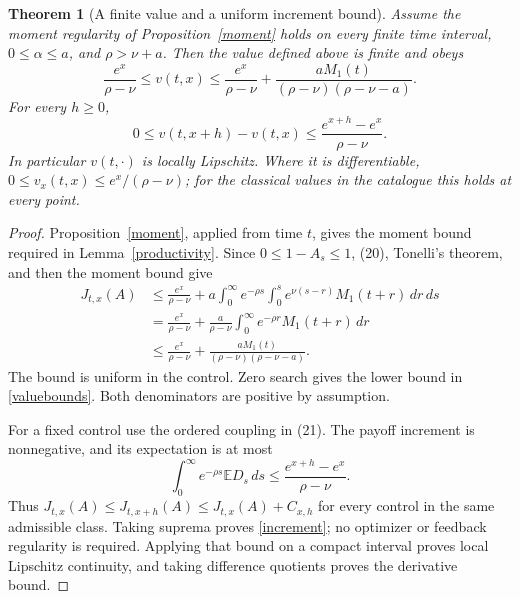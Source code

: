 \documentclass[11pt]{article}
\newtheorem{theorem}{Theorem}
\newcommand{\E}{\mathbb E}
\begin{document}
\begin{theorem}[A finite value and a uniform increment bound]\label{finitevalue}
Assume the moment regularity of Proposition~\ref{moment} holds on every
finite time interval, $0\leq\alpha\leq a$, and $\rho>\nu+a$.
Then the value defined above is finite and obeys
\begin{equation}\label{valuebounds}
 \frac{e^x}{\rho-\nu}\leq v(t,x)
 \leq\frac{e^x}{\rho-\nu}
       +\frac{aM_1(t)}{(\rho-\nu)(\rho-\nu-a)}.
\end{equation}
For every $h\geq0$,
\begin{equation}\label{increment}
 0\leq v(t,x+h)-v(t,x)
       \leq\frac{e^{x+h}-e^x}{\rho-\nu}.
\end{equation}
In particular $v(t,\cdot)$ is locally Lipschitz. Where it is differentiable,
$0\leq v_x(t,x)\leq e^x/(\rho-\nu)$; for the classical values in the
catalogue this holds at every point.
\end{theorem}
\begin{proof}
Proposition~\ref{moment}, applied from time $t$, gives the moment bound
required in Lemma~\ref{productivity}. Since $0\leq1-A_s\leq1$,
(20), Tonelli's theorem, and then the moment bound give
\begin{align*}
 J_{t,x}(A)
 &\leq\frac{e^x}{\rho-\nu}
 +a\int_0^\infty e^{-\rho s}\int_0^s
                    e^{\nu(s-r)}M_1(t+r)\,dr\,ds\\
 &=\frac{e^x}{\rho-\nu}
 +\frac a{\rho-\nu}\int_0^\infty e^{-\rho r}M_1(t+r)\,dr\\
 &\leq\frac{e^x}{\rho-\nu}
 +\frac{aM_1(t)}{(\rho-\nu)(\rho-\nu-a)}.
\end{align*}
The bound is uniform in the control. Zero search gives the lower bound
in \eqref{valuebounds}. Both denominators are positive by assumption.

For a fixed control use the ordered coupling in (21). The payoff
increment is nonnegative, and its expectation is at most
\[
 \int_0^\infty e^{-\rho s}\E D_s\,ds
 \leq\frac{e^{x+h}-e^x}{\rho-\nu}.
\]
Thus $J_{t,x}(A)\leq J_{t,x+h}(A)\leq J_{t,x}(A)+C_{x,h}$ for
every control in the same admissible class. Taking suprema proves
\eqref{increment}; no optimizer or feedback regularity is required.
Applying that bound on a compact interval proves local Lipschitz
continuity, and taking difference quotients proves the derivative bound.
\end{proof}
\end{document}
